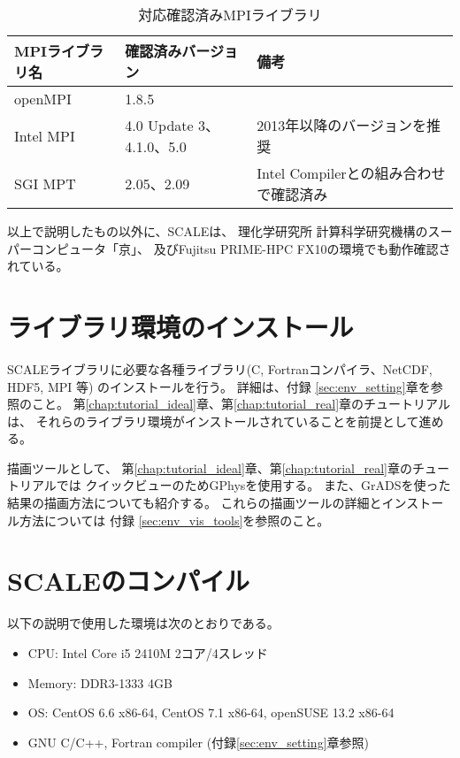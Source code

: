 \begin{table}[htb]
\begin{center}
\caption{対応確認済みMPIライブラリ}
\begin{tabularx}{150mm}{|l|l|X|} \hline
 \rowcolor[gray]{0.9} MPIライブラリ名 & 確認済みバージョン & 備考 \\ \hline
 openMPI   & 1.8.5                    & \\ \hline
 Intel MPI & 4.0 Update 3、4.1.0、5.0 & 2013年以降のバージョンを推奨 \\ \hline
 SGI MPT   & 2.05、2.09               & Intel Compilerとの組み合わせで確認済み \\ \hline
\end{tabularx}
\label{tab:compatible_mpi}
\end{center}
\end{table}

以上で説明したもの以外に、SCALEは、
理化学研究所 計算科学研究機構のスーパーコンピュータ「京」、
及びFujitsu PRIME-HPC FX10の環境でも動作確認されている。


\section{ライブラリ環境のインストール} \label{sec:inst_env}
SCALEライブラリに必要な各種ライブラリ(C, Fortranコンパイラ、NetCDF, HDF5, MPI 等)
のインストールを行う。
詳細は、付録 \ref{sec:env_setting}章を参照のこと。
第\ref{chap:tutorial_ideal}章、第\ref{chap:tutorial_real}章のチュートリアルは、
それらのライブラリ環境がインストールされていることを前提として進める。

描画ツールとして、
第\ref{chap:tutorial_ideal}章、第\ref{chap:tutorial_real}章のチュートリアルでは
クイックビューのためGPhysを使用する。
また、GrADSを使った結果の描画方法についても紹介する。
これらの描画ツールの詳細とインストール方法については
付録 \ref{sec:env_vis_tools}を参照のこと。



\section{SCALEのコンパイル} \label{sec:scale_compile}

以下の説明で使用した環境は次のとおりである。
\begin{itemize}
\item CPU: Intel Core i5 2410M 2コア/4スレッド
\item Memory: DDR3-1333 4GB
\item OS: CentOS 6.6 x86-64, CentOS 7.1 x86-64, openSUSE 13.2 x86-64
\item GNU C/C++, Fortran compiler (付録\ref{sec:env_setting}章参照)
\end{itemize}

